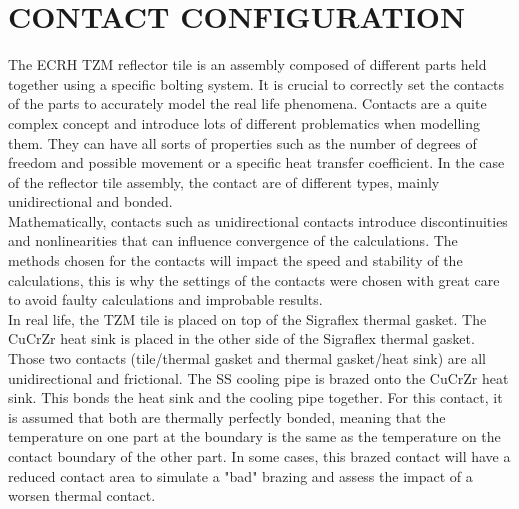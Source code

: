 \section{CONTACT CONFIGURATION}
\normalsize{The \acrshort{ECRH} \acrshort{TZM} reflector tile is an assembly composed of different parts held together using a specific bolting system. It is crucial to correctly set the contacts of the parts to accurately model the real life phenomena. Contacts are a quite complex concept and introduce lots of different problematics when modelling them. They can have all sorts of properties such as the number of degrees of freedom and possible movement or a specific heat transfer coefficient. In the case of the reflector tile assembly, the contact are of different types, mainly unidirectional and bonded.}
\\
\break
\normalsize{\indent Mathematically, contacts such as unidirectional contacts introduce discontinuities and nonlinearities that can influence convergence of the calculations. The methods chosen for the contacts will impact the speed and stability of the calculations, this is why the settings of the contacts were chosen with great care to avoid faulty calculations and improbable results.}
\\
\break
\normalsize{\indent In real life, the \acrshort{TZM} tile is placed on top of the \acrshort{Sigraflex} thermal gasket. The \acrshort{CuCrZr} heat sink is placed in the other side of the \acrshort{Sigraflex} thermal gasket. Those two contacts (tile/thermal gasket and thermal gasket/heat sink) are all unidirectional and frictional. The \acrshort{SS} cooling pipe is brazed onto the \acrshort{CuCrZr} heat sink. This bonds the heat sink and the cooling pipe together. For this contact, it is assumed that both are thermally perfectly bonded, meaning that the temperature on one part at the boundary is the same as the temperature on the contact boundary of the other part. In some cases, this brazed contact will have a reduced contact area to simulate a "bad" brazing and assess the impact of a worsen thermal contact.}
\\
\break
